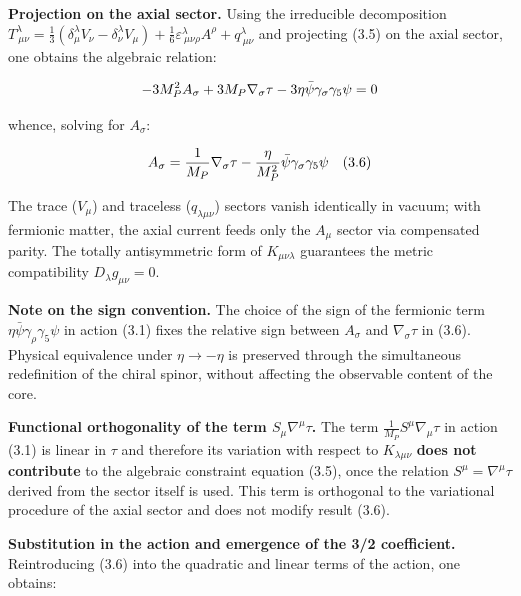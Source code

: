 ﻿\documentclass[11pt,letterpaper]{article}
\begin{document}
\textbf{Projection on the axial sector.} Using the irreducible decomposition $T^\lambda_{\ \mu\nu} = \frac{1}{3}(\delta^\lambda_\mu V_\nu - \delta^\lambda_\nu V_\mu) + \frac{1}{6}\varepsilon^\lambda_{\ \mu\nu\rho}A^\rho + q^\lambda_{\ \mu\nu}$ and projecting (3.5) on the axial sector, one obtains the algebraic relation:

\begin{equation*}
  \resizebox{\ifdim\width>\linewidth \linewidth\else\width\fi}{!}{$\displaystyle -3M_P^2 A_\sigma + 3M_P\nabla_\sigma\tau - 3\eta\bar{\psi}\gamma_\sigma\gamma_5\psi = 0$}
\end{equation*}

whence, solving for $A_\sigma$:

\begin{equation*}
  \resizebox{\ifdim\width>\linewidth \linewidth\else\width\fi}{!}{$\displaystyle A_\sigma = \frac{1}{M_P}\nabla_\sigma\tau - \frac{\eta}{M_P^2}\bar{\psi}\gamma_\sigma\gamma_5\psi \quad (3.6)$}
\end{equation*}

The trace ($V_\mu$) and traceless ($q_{\lambda\mu\nu}$) sectors vanish identically in vacuum; with fermionic matter, the axial current feeds only the $A_\mu$ sector via compensated parity. The totally antisymmetric form of $K_{\mu\nu\lambda}$ guarantees the metric compatibility $D_\lambda g_{\mu\nu} = 0$.

\textbf{Note on the sign convention.} The choice of the sign of the fermionic term $\eta\bar{\psi}\gamma_\rho\gamma_5\psi$ in action (3.1) fixes the relative sign between $A_\sigma$ and $\nabla_\sigma\tau$ in (3.6). Physical equivalence under $\eta \to -\eta$ is preserved through the simultaneous redefinition of the chiral spinor, without affecting the observable content of the core.

\textbf{Functional orthogonality of the term $S_\mu\nabla^\mu\tau$.} The term $\frac{1}{M_P}S^\mu\nabla_\mu\tau$ in action (3.1) is linear in $\tau$ and therefore its variation with respect to $K_{\lambda\mu\nu}$ \textbf{does not contribute} to the algebraic constraint equation (3.5), once the relation $S^\mu = \nabla^\mu\tau$ derived from the sector itself is used. This term is orthogonal to the variational procedure of the axial sector and does not modify result (3.6).

\textbf{Substitution in the action and emergence of the 3/2 coefficient.} Reintroducing (3.6) into the quadratic and linear terms of the action, one obtains:
\end{document}
